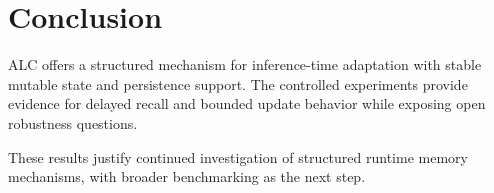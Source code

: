 \section{Conclusion}
ALC offers a structured mechanism for inference-time adaptation with stable mutable state and persistence support. The controlled experiments provide evidence for delayed recall and bounded update behavior while exposing open robustness questions.

These results justify continued investigation of structured runtime memory mechanisms, with broader benchmarking as the next step.
